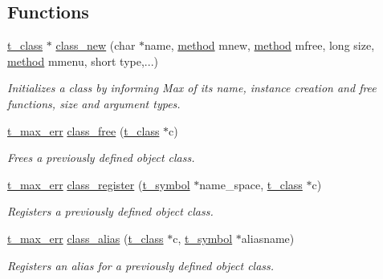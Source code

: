 \subsection*{Functions}
\begin{DoxyCompactItemize}
\item 
\hyperlink{structt__class}{t\_\-class} $\ast$ \hyperlink{group__class_ga238696d466081965c2b72b3880358404}{class\_\-new} (char $\ast$name, \hyperlink{group__datatypes_gac26ba0a173b50597f5738132e059b42d}{method} mnew, \hyperlink{group__datatypes_gac26ba0a173b50597f5738132e059b42d}{method} mfree, long size, \hyperlink{group__datatypes_gac26ba0a173b50597f5738132e059b42d}{method} mmenu, short type,...)
\begin{DoxyCompactList}\small\item\em Initializes a class by informing Max of its name, instance creation and free functions, size and argument types. \item\end{DoxyCompactList}\item 
\hyperlink{group__datatypes_ga73edaae82b318855cc09fac994918165}{t\_\-max\_\-err} \hyperlink{group__class_ga1df757149b7ad2f1d37178c5c184935f}{class\_\-free} (\hyperlink{structt__class}{t\_\-class} $\ast$c)
\begin{DoxyCompactList}\small\item\em Frees a previously defined object class. \item\end{DoxyCompactList}\item 
\hyperlink{group__datatypes_ga73edaae82b318855cc09fac994918165}{t\_\-max\_\-err} \hyperlink{group__class_ga0709af4aad9570f0cb91711a5c6d34d1}{class\_\-register} (\hyperlink{structt__symbol}{t\_\-symbol} $\ast$name\_\-space, \hyperlink{structt__class}{t\_\-class} $\ast$c)
\begin{DoxyCompactList}\small\item\em Registers a previously defined object class. \item\end{DoxyCompactList}\item 
\hyperlink{group__datatypes_ga73edaae82b318855cc09fac994918165}{t\_\-max\_\-err} \hyperlink{group__class_gab6f0ce5c584100e70106404e6068ac0d}{class\_\-alias} (\hyperlink{structt__class}{t\_\-class} $\ast$c, \hyperlink{structt__symbol}{t\_\-symbol} $\ast$aliasname)
\begin{DoxyCompactList}\small\item\em Registers an alias for a previously defined object class. \item\end{DoxyCompactList}\item 

\end{DoxyCompactItemize}
